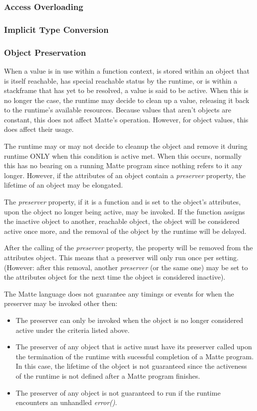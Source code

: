 \documentclass[12pt,letterpaper]{report}
\begin{document}
\subsubsection{Access Overloading}
\subsubsection{Implicit Type Conversion}
\subsubsection{Object Preservation}

When a value is in use within a function context, is stored within an object that is itself 
reachable, has special reachable status by the runtime,
or is within a stackframe that has yet to be resolved, a value is said to be active. 
When this is no longer the case, the runtime may decide to clean up a value, releasing it back 
to the runtime's available resources. Because values that aren't objects are constant, this 
does not affect Matte's operation. However, for object values, this does affect their usage.

The runtime may or may not decide to cleanup the object and remove it during runtime ONLY when 
this condition is active met. When this occurs, normally this has no bearing on a running Matte program 
since nothing refers to it any longer. However, if the attributes of an object contain a 
\textit{preserver} property, the lifetime of an object may be elongated.

The \textit{preserver} property, if it is a function and is set to the object's attributes, 
upon the object no longer being active, may be invoked. If the function assigns the inactive object 
to another, reachable object, the object will be considered active once more, and the removal 
of the object by the runtime will be delayed.

After the calling of the \textit{preserver} property, the property will be removed from the 
attributes object. This means that a preserver will only run once per setting. (However: after this removal, another 
\textit{preserver} (or the same one) may be set to the attributes object for the next time 
the object is considered inactive).

The Matte language does not guarantee any timings or events for when the preserver may be invoked other 
then: 

\begin{itemize}
  \item The preserver can only be invoked when the object is no longer considered active under the criteria listed above.
  \item The preserver of any object that is active must have its preserver called upon the termination of the runtime with sucessful completion of a Matte program. In this case, the lifetime of the object is not guaranteed since the activeness of the runtime is not defined after a Matte program finishes.
  \item The preserver of any object is not guaranteed to run if the runtime encounters an unhandled \textit{error()}.
\end{itemize}
\end{document}
